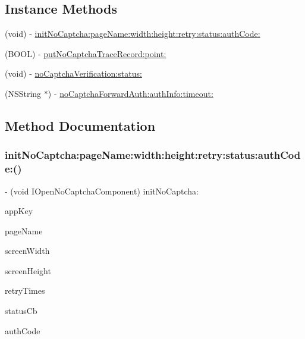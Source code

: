 \subsection*{Instance Methods}
\begin{DoxyCompactItemize}
\item 
(void) -\/ \mbox{\hyperlink{protocol_i_open_no_captcha_component_01-p_abcad8925455b62d3c8d9da2c8a85af6f}{init\+No\+Captcha\+:page\+Name\+:width\+:height\+:retry\+:status\+:auth\+Code\+:}}
\item 
(B\+O\+OL) -\/ \mbox{\hyperlink{protocol_i_open_no_captcha_component_01-p_a2f67e21ab8dbcad39dff803646c6e132}{put\+No\+Captcha\+Trace\+Record\+:point\+:}}
\item 
(void) -\/ \mbox{\hyperlink{protocol_i_open_no_captcha_component_01-p_a4d1b2110adc089faa210675f7df3fdd1}{no\+Captcha\+Verification\+:status\+:}}
\item 
(N\+S\+String $\ast$) -\/ \mbox{\hyperlink{protocol_i_open_no_captcha_component_01-p_a3225bcf0d2483322b53dedf62c4c6eee}{no\+Captcha\+Forward\+Auth\+:auth\+Info\+:timeout\+:}}
\end{DoxyCompactItemize}


\subsection{Method Documentation}
\mbox{\label{protocol_i_open_no_captcha_component_01-p_abcad8925455b62d3c8d9da2c8a85af6f}} 
\subsubsection{\texorpdfstring{init\+No\+Captcha\+:page\+Name\+:width\+:height\+:retry\+:status\+:auth\+Code\+:()}{initNoCaptcha:pageName:width:height:retry:status:authCode:()}}
{\footnotesize\ttfamily -\/ (void I\+Open\+No\+Captcha\+Component) init\+No\+Captcha\+: \begin{DoxyParamCaption}\item[{(N\+S\+String $\ast$)}]{app\+Key }\item[{pageName:(N\+S\+String $\ast$)}]{page\+Name }\item[{width:(int)}]{screen\+Width }\item[{height:(int)}]{screen\+Height }\item[{retry:(int)}]{retry\+Times }\item[{status:(void($^\wedge$)(N\+S\+Integer status, C\+G\+Point pt1, C\+G\+Point pt2, N\+S\+String $\ast$token, N\+S\+String $\ast$sig, N\+S\+String $\ast$session\+ID))}]{status\+Cb }\item[{authCode:(N\+S\+String $\ast$)}]{auth\+Code }\end{DoxyParamCaption}}

